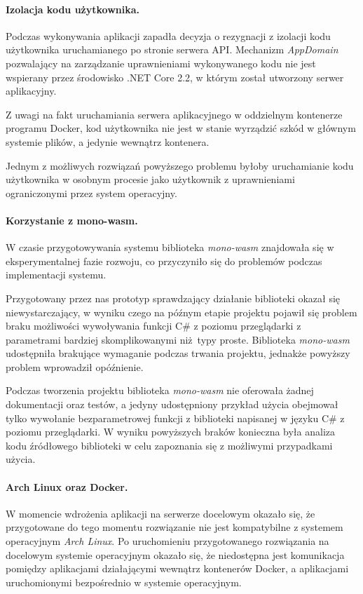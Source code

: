 \documentclass[a4paper,11pt,twoside]{report}
\theoremstyle{definition}
\begin{document}
        \paragraph{Izolacja kodu użytkownika.}
            \label{problemy-izolacja-kodu-uzytkownika}
            Podczas wykonywania aplikacji zapadła decyzja o rezygnacji z izolacji kodu użytkownika uruchamianego po stronie serwera API. Mechanizm \textit{AppDomain} pozwalający na zarządzanie uprawnieniami wykonywanego kodu nie jest wspierany przez środowisko .NET Core 2.2, w którym został utworzony serwer aplikacyjny. 
            
            Z uwagi na fakt uruchamiania serwera aplikacyjnego w oddzielnym kontenerze programu Docker, kod użytkownika nie jest w stanie wyrządzić szkód w głównym systemie plików, a jedynie wewnątrz kontenera.
            
            Jednym z możliwych rozwiązań powyższego problemu byłoby uruchamianie kodu użytkownika w osobnym procesie jako użytkownik z uprawnieniami ograniczonymi przez system operacyjny.
            
        \paragraph{Korzystanie z mono-wasm.}     
            W czasie przygotowywania systemu biblioteka \textit{mono-wasm} znajdowała się w eksperymentalnej fazie rozwoju, co przyczyniło się do problemów podczas implementacji systemu.
            
            Przygotowany przez nas prototyp sprawdzający działanie biblioteki okazał się niewystarczający, w wyniku czego na późnym etapie projektu pojawił się problem braku możliwości wywoływania funkcji C\# z poziomu przeglądarki z parametrami bardziej skomplikowanymi niż typy proste. Biblioteka \textit{mono-wasm} udostępniła brakujące wymaganie podczas trwania projektu, jednakże powyższy problem wprowadził opóźnienie.
            
            Podczas tworzenia projektu biblioteka \textit{mono-wasm} nie oferowała żadnej dokumentacji oraz testów, a jedyny udostępniony przykład użycia obejmował tylko wywołanie bezparametrowej funkcji z biblioteki napisanej w języku C\# z poziomu przeglądarki. W wyniku powyższych braków konieczna była analiza kodu źródłowego biblioteki w celu zapoznania się z możliwymi przypadkami użycia.
        
        \paragraph{Arch Linux oraz Docker.}
            W momencie wdrożenia aplikacji na serwerze docelowym okazało się, że przygotowane do tego momentu rozwiązanie nie jest kompatybilne z systemem operacyjnym \textit{Arch Linux}. Po uruchomieniu przygotowanego rozwiązania na docelowym systemie operacyjnym okazało się, że niedostępna jest komunikacja pomiędzy aplikacjami działającymi wewnątrz kontenerów Docker, a aplikacjami uruchomionymi bezpośrednio w systemie operacyjnym.
            
\end{document}
